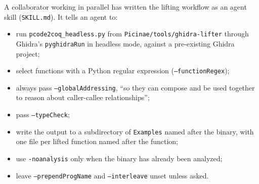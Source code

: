 \documentclass[11pt]{article}
\newcommand{\code}[1]{\texttt{#1}}
\begin{document}
A collaborator working in parallel has written the lifting workflow as an
agent skill (\code{SKILL.md}).  It tells an agent to:
\begin{itemize}[nosep]
\item run \code{pcode2coq\_headless.py} from
      \code{Picinae/tools/ghidra-lifter} through Ghidra's \code{pyghidraRun}
      in headless mode, against a pre-existing Ghidra project;
\item select functions with a Python regular expression
      (\code{--functionRegex});
\item always pass \code{--globalAddressing}, ``so they can compose and be
      used together to reason about caller-callee relationships'';
\item pass \code{--typeCheck};
\item write the output to a subdirectory of \code{Examples} named after the
      binary, with one file per lifted function named after the function;
\item use \code{-noanalysis} only when the binary has already been analyzed;
\item leave \code{--prependProgName} and \code{--interleave} unset unless
      asked.
\end{itemize}
\end{document}
